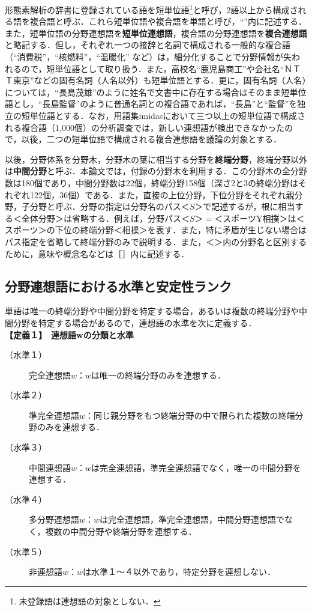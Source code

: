 形態素解析の辞書に登録されている語を短単位語\footnote{未登録語は連想語の対象としない．}と呼び，2語以上から構成される語を複合語と呼ぶ．これら短単位語や複合語を単語と呼び，``''内に記述する．また，短単位語の分野連想語を{\bf 短単位連想語}，複合語の分野連想語を{\bf 複合連想語}と略記する．但し，それぞれ一つの接辞と名詞で構成される一般的な複合語（``消費税''，``核燃料''，``温暖化'' など）は，細分化することで分野情報が失われるので，短単位語として取り扱う．また，高校名``鹿児島商工''や会社名``ＮＴＴ東京''などの固有名詞（人名以外）も短単位語とする．更に，固有名詞（人名）については，``長島茂雄''のように姓名で文書中に存在する場合はそのまま短単位語とし，``長島監督''のように普通名詞との複合語であれば，``長島''と``監督''を独立の短単位語とする．なお，用語集imidas\cite{戸澤1998}において三つ以上の短単位語で構成される複合語（1,000個）の分析調査では，新しい連想語が検出できなかったので，以後，二つの短単位語で構成される複合連想語を議論の対象とする．

以後，分野体系を分野木，分野木の葉に相当する分野を{\bf 終端分野}，終端分野以外は{\bf 中間分野}と呼ぶ．本論文では，付録の分野木を利用する．この分野木の全分野数は180個であり，中間分野数は22個，終端分野158個（深さ2と3の終端分野はそれぞれ122個，36個）である．また，直接の上位分野，下位分野をそれぞれ親分野，子分野と呼ぶ．分野の指定は分野名のパス$＜S＞$で記述するが，根に相当する＜全体分野＞は省略する．例えば，\mbox{分野パス$＜S＞=$＜ス}ポーツ¥相撲＞は＜スポーツ＞の下位の終端分野＜相撲＞を表す．また，特に矛盾が生じない場合はパス指定を省略して終端分野のみで説明する．また，＜＞内の分野名と区別するために，意味や概念名などは［］内に記述する．

\subsection{分野連想語における水準と安定性ランク}

単語は唯一の終端分野や中間分野を特定する場合，あるいは複数の終端分野や中間分野を特定する場合があるので，連想語の水準を次に定義する．\\
{\bf 【定義１】　連想語wの分類と水準}
\begin{description}
\item[（水準１）] 完全連想語$w$：$w$は唯一の終端分野のみを連想する．
\item[（水準２）] 準完全連想語$w$：同じ親分野をもつ終端分野の中で限られた複数の終端分野のみを連想する．
\item[（水準３）] 中間連想語$w$：$w$は完全連想語，準完全連想語でなく，唯一の中間分野を連想する．
\item[（水準４）] 多分野連想語$w$：$w$は完全連想語，準完全連想語，中間分野連想語でなく，\mbox{複数の}中間分野や終端分野を連想する．
\item[（水準５）]非連想語$w$：$w$は水準１〜４以外であり，特定分野を連想しない．
\end{description}

